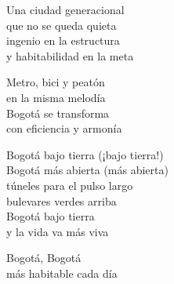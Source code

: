\begin{lyrics}
Una ciudad generacional\\
que no se queda quieta\\
ingenio en la estructura\\
y habitabilidad en la meta

Metro, bici y peatón\\
en la misma melodía\\
Bogotá se transforma\\
con eficiencia y armonía

Bogotá bajo tierra
(¡bajo tierra!)\\
Bogotá más abierta
(más abierta)\\
túneles para el pulso largo\\
bulevares verdes arriba\\
Bogotá bajo tierra\\
y la vida va más viva

Bogotá, Bogotá\\
más habitable cada día
\end{lyrics}

